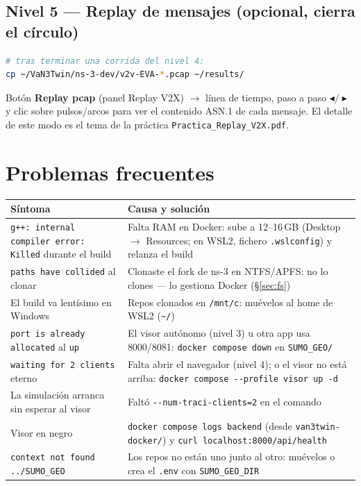 \documentclass[11pt,a4paper]{article}
\begin{document}
\subsection{Nivel 5 — Replay de mensajes (opcional, cierra el círculo)}

\begin{encontenedor}
\begin{lstlisting}[language=bash]
# tras terminar una corrida del nivel 4:
cp ~/VaN3Twin/ns-3-dev/v2v-EVA-*.pcap ~/results/
\end{lstlisting}
\end{encontenedor}

\begin{ennavegador}
Botón \textbf{Replay pcap} (panel Replay V2X) $\rightarrow$ línea de tiempo,
paso a paso $\blacktriangleleft/\blacktriangleright$ y clic sobre pulsos/arcos
para ver el contenido ASN.1 de cada mensaje. El detalle de este modo es el
tema de la práctica \texttt{Practica\_Replay\_V2X.pdf}.
\end{ennavegador}

\section{Problemas frecuentes}

\begin{center}
\small
\begin{tabular}{@{}p{}p{}@{}}
\toprule
\textbf{Síntoma} & \textbf{Causa y solución} \\
\midrule
\texttt{g++: internal compiler error: Killed} durante el build & Falta RAM en Docker: sube a 12--16\,GB (Desktop $\to$ Resources; en WSL2, fichero \texttt{.wslconfig}) y relanza el build \\
\texttt{paths have collided} al clonar & Clonaste el fork de ns-3 en NTFS/APFS: no lo clones — lo gestiona Docker (§\ref{sec:fs}) \\
El build va lentísimo en Windows & Repos clonados en \texttt{/mnt/c}: muévelos al home de WSL2 (\texttt{\textasciitilde{}/}) \\
\texttt{port is already allocated} al \texttt{up} & El visor autónomo (nivel 3) u otra app usa 8000/8081: \texttt{docker compose down} en \texttt{SUMO\_GEO/} \\
\texttt{waiting for 2 clients} eterno & Falta abrir el navegador (nivel 4); o el visor no está arriba: \texttt{docker compose -{}-profile visor up -d} \\
La simulación arranca sin esperar al visor & Faltó \texttt{-{}-num-traci-clients=2} en el comando \\
Visor en negro & \texttt{docker compose logs backend} (desde \texttt{van3twin-docker/}) y \texttt{curl localhost:8000/api/health} \\
\texttt{context not found ../SUMO\_GEO} & Los repos no están uno junto al otro: muévelos o crea el \texttt{.env} con \texttt{SUMO\_GEO\_DIR} \\
\bottomrule
\end{tabular}
\end{center}
\end{document}
